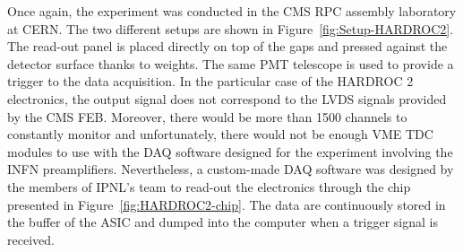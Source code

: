 	Once again, the experiment was conducted in the CMS RPC assembly laboratory at CERN. The two different setups are shown in Figure~\ref{fig:Setup-HARDROC2}. The read-out panel is placed directly on top of the gaps and pressed against the detector surface thanks to weights. The same PMT telescope is used to provide a trigger to the data acquisition. In the particular case of the HARDROC 2 electronics, the output signal does not correspond to the LVDS signals provided by the CMS FEB. Moreover, there would be more than 1500 channels to constantly monitor and unfortunately, there would not be enough VME TDC modules to use with the DAQ software designed for the experiment involving the INFN preamplifiers. Nevertheless, a custom-made DAQ software was designed by the members of IPNL's team to read-out the electronics through the chip presented in Figure~\ref{fig:HARDROC2-chip}. The data are continuously stored in the buffer of the ASIC and dumped into the computer when a trigger signal is received.
	
\endgroup
	
